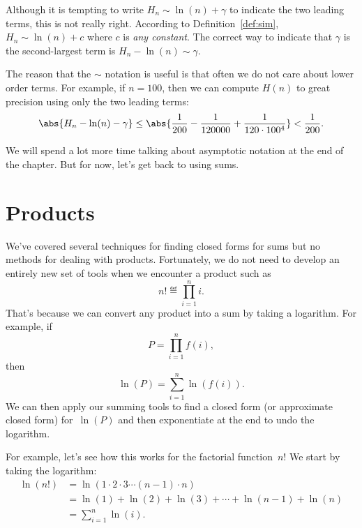 Although it is tempting to write $H_n \sim \ln(n) + \gamma$ to indicate
the two leading terms, this is not really right.  According to
Definition~\ref{def:sim}, $H_n \sim \ln(n) + c$ where $c$ is \emph{any
  constant}.  The correct way to indicate that $\gamma$ is the
second-largest term is $H_n - \ln(n) \sim \gamma$.

The reason that the $\sim$ notation is useful is that often we do not care
about lower order terms.  For example, if $n = 100$, then we can compute
$H(n)$ to great precision using only the two leading terms:
\[
\abs{H_n - \ln(n) - \gamma} \leq \abs{\frac{1}{200} - \frac{1}{120000} +
\frac{1}{120 \cdot 100^4}} < \frac{1}{200}.
\]

We will spend a lot more time talking about asymptotic notation at the
end of the chapter.  But for now, let's get back to using sums.

\begin{problems}
\classproblems
{}

\homeworkproblems
{}

\end{problems}



\section{Products}\label{sec:closed_products}

We've covered several techniques for finding closed forms for sums but
no methods for dealing with products.  Fortunately, we do not need to
develop an entirely new set of tools when we encounter a product such
as
\begin{equation}\label{eqn:9P1}
    n! \eqdef \prod_{i = 1}^n i.
\end{equation}
That's because we can convert any product into a sum by taking a
logarithm.  For example, if
\[
    P = \prod_{i  = 1}^n f(i),
\]
then
\[
    \ln(P) = \sum_{i = 1}^n \ln(f(i)).
\]
We can then apply our summing tools to find a closed form (or
approximate closed form) for~$\ln(P)$ and then exponentiate at the end
to undo the logarithm.

For example, let's see how this works for the factorial
function~$n!$  We start by taking the logarithm:
\begin{align*}
\ln (n!)
       & =  \ln(1 \cdot 2 \cdot 3 \cdots (n-1) \cdot n) \\
       & =  \ln(1) + \ln(2) + \ln(3) + \cdots + \ln(n-1) + \ln(n) \\
       & =  \sum_{i=1}^n \ln(i).
\end{align*}

